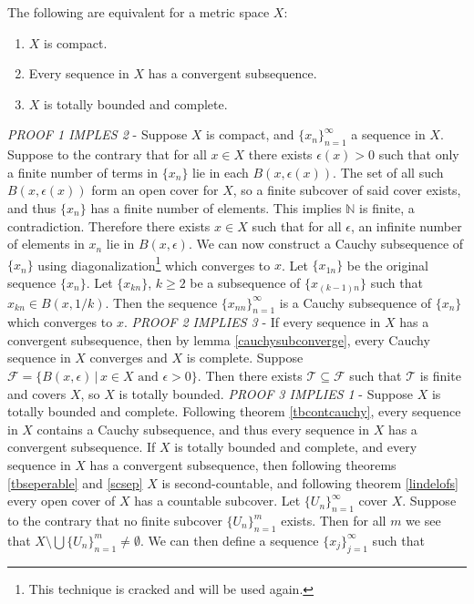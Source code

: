 \documentclass[nobib,notoc]{tufte-handout}
\begin{document}
\begin{thm}
	The following are equivalent for a metric space \(X\):
	\begin{enumerate}
		\item \(X\) is compact.
		\item Every sequence in \(X\) has a convergent subsequence.
		\item \(X\) is totally bounded and complete.
	\end{enumerate}
	\begin{IEEEproof}
		\label{betterhb}
		\emph{PROOF 1 IMPLES 2} - Suppose \(X\) is compact, and \(\{x_n\}_{n=1}^{\infty}\) a sequence in \(X\). Suppose to the contrary that for all \(x\in X\) there exists \(\epsilon(x)>0\) such that only a finite number of terms in \(\{x_n\}\) lie in each \(B(x,\epsilon(x))\). The set of all such \(B(x,\epsilon(x))\) form an open cover for \(X\), so a finite subcover of said cover exists, and thus \(\{x_n\}\) has a finite number of elements. This implies \(\mathbb{N}\) is finite, a contradiction. Therefore there exists \(x\in X\) such that for all \(\epsilon\), an infinite number of elements in \(x_n\) lie in \(B(x,\epsilon)\). We can now construct a Cauchy subsequence of \(\{x_n\}\) using diagonalization\footnote{This technique is cracked and will be used again.} which converges to \(x\). Let \(\{x_{1n}\}\) be the original sequence \(\{x_n\}\). Let \(\{x_{kn}\}\), \(k\geq 2\) be a subsequence of \(\{x_{(k-1)n}\}\) such that \(x_{kn}\in B(x,1/k)\). Then the sequence \(\{x_{nn}\}_{n=1}^{\infty}\) is a Cauchy subsequence of \(\{x_n\}\) which converges to \(x\).
		\bigbreak
		\emph{PROOF 2 IMPLIES 3} - If every sequence in \(X\) has a convergent subsequence, then by lemma \ref{cauchysubconverge}, every Cauchy sequence in \(X\) converges and \(X\) is complete. Suppose \(\mathscr{F}=\{B(x,\epsilon)\,|\,x\in X\text{ and } \epsilon>0\}\). Then there exists \(\mathscr{T}\subseteq\mathscr{F}\) such that \(\mathscr{T}\) is finite and covers \(X\), so \(X\) is totally bounded.
		\bigbreak
		\emph{PROOF 3 IMPLIES 1} - Suppose \(X\) is totally bounded and complete. Following theorem \ref{tbcontcauchy}, every sequence in \(X\) contains a Cauchy subsequence, and thus every sequence in \(X\) has a convergent subsequence. If \(X\) is totally bounded and complete, and every sequence in \(X\) has a convergent subsequence, then following theorems \ref{tbseperable} and \ref{scsep} \(X\) is second-countable, and following theorem \ref{lindelofs} every open cover of \(X\) has a countable subcover. Let \(\{U_n\}_{n=1}^{\infty}\) cover \(X\). Suppose to the contrary that no finite subcover \(\{U_n\}_{n=1}^{m}\) exists. Then for all \(m\) we see that \(X\setminus\bigcup\{U_n\}_{n=1}^{m}\neq\emptyset\). We can then define a sequence \(\{x_j\}_{j=1}^{\infty}\) such that

\end{IEEEproof}
\end{thm}
\end{document}
